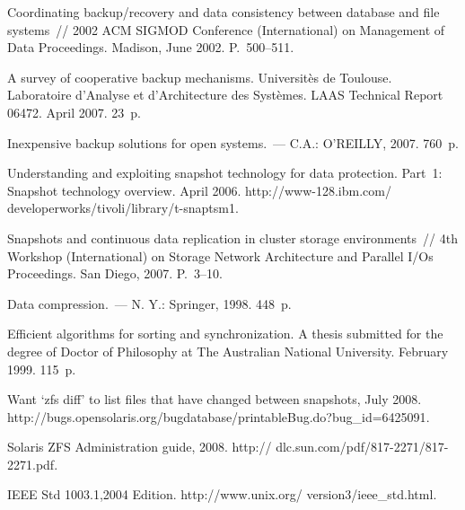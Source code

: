 \begin{multicols}{2}
{{\begin{thebibliography}{99}
Coordinating backup/recovery and data consistency between database and file 
systems~// 2002 ACM SIGMOD  Conference (International) on Management of Data 
Proceedings. Madison, June 2002. P.~500--511.

A survey of cooperative backup mechanisms. Universit\`{e}s de Toulouse. 
Laboratoire d'Analyse et d'Architecture des Syst\`{e}mes. LAAS Technical Report 
06472. April 2007. 23~p.

Inexpensive backup solutions for open systems.~--- C.A.: O'REILLY, 2007. 760~p.

Understanding and exploiting snapshot technology for data protection. Part~1: 
Snapshot technology overview. April 2006. 
{\sf http://www-128.ibm.com/ developerworks/tivoli/library/t-snaptsm1}.

Snapshots and continuous data replication in cluster storage environments~// 4th 
Workshop (International) on Storage Network Architecture and Parallel I/Os 
Proceedings. San Diego, 2007. P.~3--10.

Data compression.~---  N. Y.: Springer, 1998. 448~p.

Efficient algorithms for sorting and synchronization. A thesis submitted for the 
degree of Doctor of Philosophy at The Australian National University. February 
1999. 115~p.

Want `zfs diff' to list files that have changed between snapshots, July 2008.   {\sf 
http://bugs.opensolaris.org/\linebreak bugdatabase/printableBug.do?bug\_id=6425091}.

\label{end\stat}

Solaris ZFS Administration guide, 2008. {\sf 
http:// dlc.sun.com/pdf/817-2271/817-2271.pdf}.



IEEE Std 1003.1,2004 Edition. {\sf http://www.unix.org/ version3/ieee\_std.html}.

\end{thebibliography}
}
}
\end{multicols}
   
 
 
 
 